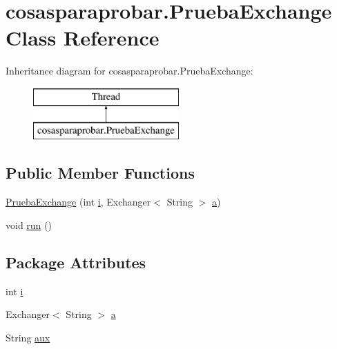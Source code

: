 \hypertarget{classcosasparaprobar_1_1_prueba_exchange}{}\section{cosasparaprobar.\+Prueba\+Exchange Class Reference}
\label{classcosasparaprobar_1_1_prueba_exchange}
Inheritance diagram for cosasparaprobar.\+Prueba\+Exchange\+:\begin{figure}[H]
\begin{center}
\leavevmode
\includegraphics[height=2.000000cm]{classcosasparaprobar_1_1_prueba_exchange}
\end{center}
\end{figure}
\subsection*{Public Member Functions}
\begin{DoxyCompactItemize}
\item 
\mbox{\hyperlink{classcosasparaprobar_1_1_prueba_exchange_ad9e7b50dfabee058757d9f2fb7ea83b1}{Prueba\+Exchange}} (int \mbox{\hyperlink{classcosasparaprobar_1_1_prueba_exchange_ad45f6d758155fab2ad13a5f7b403c1b6}{i}}, Exchanger$<$ String $>$ \mbox{\hyperlink{classcosasparaprobar_1_1_prueba_exchange_a9c9b91539573982d12dc4f56a948e527}{a}})
\item 
void \mbox{\hyperlink{classcosasparaprobar_1_1_prueba_exchange_a67dfba19ce6f5d55f46f066b45783311}{run}} ()
\end{DoxyCompactItemize}
\subsection*{Package Attributes}
\begin{DoxyCompactItemize}
\item 
int \mbox{\hyperlink{classcosasparaprobar_1_1_prueba_exchange_ad45f6d758155fab2ad13a5f7b403c1b6}{i}}
\item 
Exchanger$<$ String $>$ \mbox{\hyperlink{classcosasparaprobar_1_1_prueba_exchange_a9c9b91539573982d12dc4f56a948e527}{a}}
\item 
String \mbox{\hyperlink{classcosasparaprobar_1_1_prueba_exchange_a6b85e0f1bfaba3f17f162a97625b6e64}{aux}}
\end{DoxyCompactItemize}


